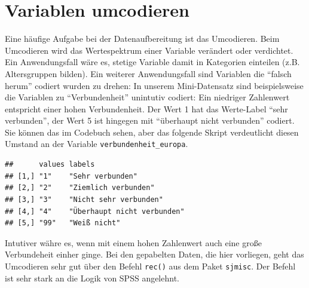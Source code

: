\documentclass[
]{book}
\newenvironment{Shaded}{\begin{snugshade}}{\end{snugshade}}
\newcommand{\CommentTok}[1]{\textcolor[rgb]{0.56,0.35,0.01}{\textit{#1}}}
\newcommand{\FunctionTok}[1]{\textcolor[rgb]{0.00,0.00,0.00}{#1}}
\newcommand{\NormalTok}[1]{#1}
\newcommand{\OtherTok}[1]{\textcolor[rgb]{0.56,0.35,0.01}{#1}}
\newcommand{\SpecialCharTok}[1]{\textcolor[rgb]{0.00,0.00,0.00}{#1}}
\begin{document}
\hypertarget{variablen-umcodieren}{%
\section{Variablen umcodieren}\label{variablen-umcodieren}}

Eine häufige Aufgabe bei der Datenaufbereitung ist das Umcodieren. Beim Umcodieren wird das Wertespektrum einer Variable verändert oder verdichtet. Ein Anwendungsfall wäre es, stetige Variable damit in Kategorien einteilen (z.B. Altersgruppen bilden). Ein weiterer Anwendungsfall sind Variablen die ``falsch herum'' codiert wurden zu drehen: In unserem Mini-Datensatz sind beispielsweise die Variablen zu ``Verbundenheit'' unintutiv codiert: Ein niedriger Zahlenwert entspricht einer hohen Verbundenheit. Der Wert 1 hat das Werte-Label ``sehr verbunden'', der Wert 5 ist hingegen mit ``überhaupt nicht verbunden'' codiert. Sie können das im Codebuch sehen, aber das folgende Skript verdeutlicht diesen Umstand an der Variable \texttt{verbundenheit\_europa}.

\begin{Shaded}
\end{Shaded}

\begin{verbatim}
##      values labels                     
## [1,] "1"    "Sehr verbunden"           
## [2,] "2"    "Ziemlich verbunden"       
## [3,] "3"    "Nicht sehr verbunden"     
## [4,] "4"    "Überhaupt nicht verbunden"
## [5,] "99"   "Weiß nicht"
\end{verbatim}

Intutiver währe es, wenn mit einem hohen Zahlenwert auch eine große Verbundeheit einher ginge. Bei den gepabelten Daten, die hier vorliegen, geht das Umcodieren sehr gut über den Befehl \texttt{rec()} aus dem Paket \texttt{sjmisc}. Der Befehl ist sehr stark an die Logik von SPSS angelehnt.
\end{document}

